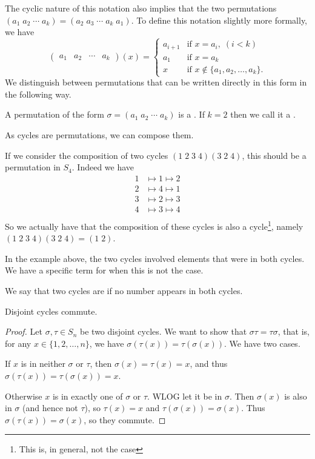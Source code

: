 \documentclass[a4paper]{scrartcl}
\begin{document}
The cyclic nature of this notation also implies that the two permutations $(a_1\; a_2\; \cdots\; a_k) = (a_2\; a_3\; \cdots\; a_k\; a_1)$. To define this notation slightly more formally, we have
$$
\begin{pmatrix}
	a_1 & a_2 & \cdots & a_k
\end{pmatrix} (x) = \begin{cases}
	a_{i + 1} &\mbox{if } x = a_i, \; (i < k) \\
	a_1 &\mbox{if } x = a_k \\
	x &\mbox{if } x \not \in \{a_1, a_2, \dots, a_k\}.
   \end{cases}
$$
We distinguish between permutations that can be written directly in this form in the following way.
\begin{definition}
	A permutation of the form $\sigma = (a_1\; a_2\; \cdots\; a_k)$ is a . If $k = 2$ then we call it a .
\end{definition}

As cycles are permutations, we can compose them.
\begin{example}
If we consider the composition of two cycles $(1\; 2\; 3\; 4)(3 \; 2\; 4)$, this should be a permutation in $S_4$. Indeed we have
\begin{align*}
	1 &\longmapsto 1 \longmapsto 2 \\
	2 &\longmapsto 4 \longmapsto 1 \\
	3 &\longmapsto 2 \longmapsto 3 \\
	4 &\longmapsto 3 \longmapsto 4 \\
\end{align*}
So we actually have that the composition of these cycles is also a cycle\footnote{This is, in general, not the case}, namely $(1\; 2\; 3\; 4)(3 \; 2\; 4) = (1\; 2)$. 
\end{example}

In the example above, the two cycles involved elements that were in both cycles. We have a specific term for when this is not the case.

\begin{definition}
	We say that two cycles are  if no number appears in both cycles.
\end{definition}
\begin{lemma}
	Disjoint cycles commute.
\end{lemma}
\begin{proof}
	Let $\sigma, \tau \in S_n$ be two disjoint cycles. We want to show that $\sigma \tau = \tau \sigma$, that is, for any $x \in \{1, 2, \dots, n\}$, we have $\sigma(\tau(x)) = \tau(\sigma(x))$. We have two cases.

	If $x$ is in neither $\sigma$ or $\tau$, then $\sigma(x) = \tau(x) = x$, and thus $\sigma(\tau(x)) = \tau(\sigma(x)) = x$.

	Otherwise $x$ is in exactly one of $\sigma$ or $\tau$. WLOG let it be in $\sigma$. Then $\sigma(x)$ is also in $\sigma$ (and hence not $\tau$), so $\tau(x) = x$ and $\tau(\sigma(x)) = \sigma(x)$. Thus $\sigma(\tau(x)) = \sigma(x)$, so they commute.
\end{proof}
\end{document}
